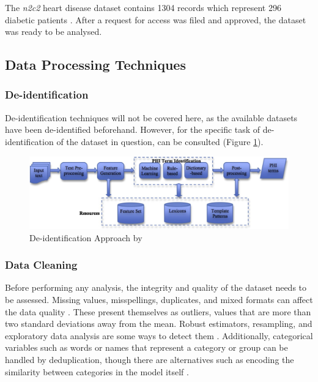 \documentclass[a4paper,12pt]{article}
\begin{document}
The \textit{n2c2} heart disease dataset contains 1304 records which represent 296
diabetic patients \parencite{Kumar2015}.
After a request for access was filed and approved, the dataset was ready to be
analysed.


\subsection{Data Processing Techniques}

\subsubsection{De-identification}

De-identification techniques will not be covered here,
as the available datasets have been de-identified beforehand.
However, for the specific task of de-identification of the dataset in question,
\textcite{Yang2015} can be consulted (Figure \ref{fig:deid}).

\begin{figure}[h]
\centering
\scriptsize
\includegraphics{deid}
\caption{De-identification Approach by \textcite{Yang2015}}
\label{fig:deid}
\end{figure}

\subsubsection{Data Cleaning}

Before performing any analysis, the integrity and quality of the dataset needs
to be assessed.
Missing values, misspellings, duplicates, and mixed formats can affect the
data quality \parencite{Chu2016}.
These present themselves as outliers, values that are more than two standard
deviations away from the mean.
Robust estimators, resampling, and exploratory data analysis are some ways to
detect them \parencite{Hellerstein2008}.
Additionally, categorical variables such as words or names that represent a
category or group can be handled by deduplication,
though there are alternatives such as encoding the similarity between
categories in the model itself \parencite{Cerda2018}.
\end{document}
